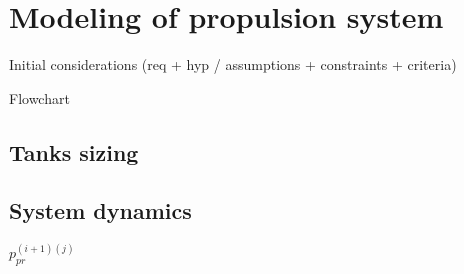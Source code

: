 \section{Modeling of propulsion system}
\label{sec:modeling}

Initial considerations (req + hyp / assumptions + constraints + criteria)

Flowchart

\subsection{Tanks sizing}
\label{subsec:tanks}

\subsection{System dynamics}
\label{subsec:dynamics}

$p_{pr}^{(i+1)(j)}$